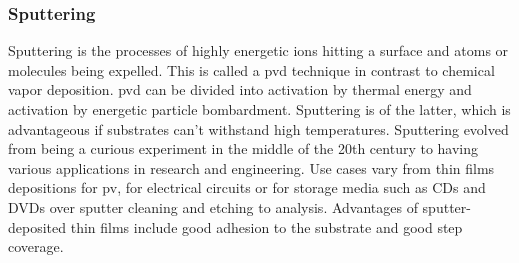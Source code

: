 \subsubsection{Sputtering}
Sputtering is the processes of highly energetic ions hitting a surface and atoms or molecules being expelled. 
This is called a \gls{pvd} technique in contrast to chemical vapor deposition. 
\Gls{pvd} can be divided into activation by thermal energy and activation by energetic particle bombardment. 
Sputtering is of the latter, which 
is advantageous if substrates can't withstand high temperatures.
Sputtering evolved from being a curious experiment in the middle of the 20th century to 
having various applications in research and engineering.
Use cases vary from thin films depositions for \gls{pv}, 
for electrical circuits or for storage media such as CDs and DVDs 
over sputter cleaning and etching to analysis.
Advantages of sputter-deposited thin films include good adhesion to the substrate 
and good step coverage\cite{Swann1988}.

